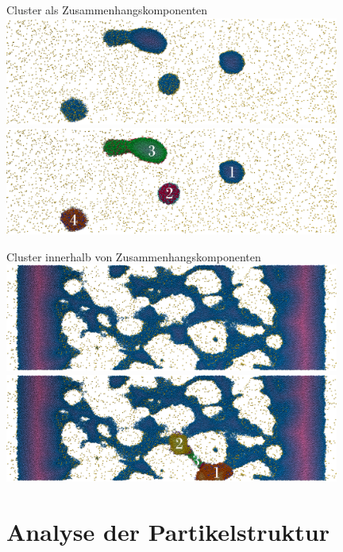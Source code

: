 \documentclass[10pt]{beamer}
\begin{document}
\begin{frame}Cluster als Zusammenhangskomponenten
	\includegraphics*[width=11cm]{media/cluster/SignedDistanceColor-Frame-090-clipplane20-letterbox.png}\\
	\includegraphics*[width=11cm]{media/cluster/SignedDistanceColor-Frame-090-clipplane20-letterbox-Cluster.png}
\end{frame}

\begin{frame}Cluster innerhalb von Zusammenhangskomponenten
	\includegraphics*[width=11cm]{media/cluster/SignedDistanceColor-Frame-016-clipplane20-letterbox.png}\\
	\includegraphics*[width=11cm]{media/cluster/SignedDistanceColor-Frame-016-clipplane20-letterbox-Cluster.png}
\end{frame}

\section{Analyse der Partikelstruktur}
\end{document}
